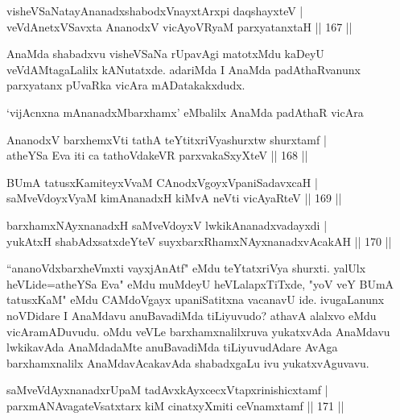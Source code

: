 \begin{shl}
visheVSaNatayA\s \s nanadxshabodxV\s nayxtArxpi daqshayxteV |\\
veVdAnetxVSavxta AnanodxV vicAyoVR\s yaM parxyatanxtaH \hfill || 167 ||
\end{shl}

\begin{artha}
AnaMda shabadxvu visheVSaNa rUpavAgi matotxMdu kaDeyU veVdAMtagaLalilx kANutatxde. adariMda I AnaMda padAthaRvanunx parxyatanx pUvaRka vicAra mADatakakxdudx.
\end{artha}
\centerline{`vijAcnxna mAnanadxMbarxhamx' eMbalilx AnaMda padAthaR vicAra}

\begin{shl}
AnanodxV barxhemxVti tathA teYtitxriVyashurxtw shurxtamf |\\
atheYSa Eva iti ca tathoVdakeVR parxvakaSxyXteV \hfill || 168 ||
\end{shl}

\begin{shl}
BUmA tatusxKamiteyxVvaM CAnodxVgoyxVpaniSadavxcaH |\\
saMveVdoyxV\s yaM kimAnanadxH kiMvA neVti vicAyaRteV \hfill || 169 ||
\end{shl}

\begin{shl}
barxhamxNAyxnanadxH saMveVdoyxV lwkikAnanadxvadayxdi |\\
yukAtxH shabAdxsatxdeYteV suyxbarxRhamxNAyxnanadxvAcakAH \hfill || 170 ||
\end{shl}

\begin{artha}
``ananoVdxbarxheVmxti vayxjAnAtf" eMdu teYtatxriVya shurxti. yalUlx heVLide=atheYSa Eva" eMdu muMdeyU heVLalapxTiTxde, "yoV veY BUmA tatusxKaM" eMdu CAMdoVgayx upaniSatitxna vacanavU ide. ivugaLanunx noVDidare I AnaMdavu anuBavadiMda tiLiyuvudo? athavA alalxvo eMdu vicAramADuvudu. oMdu veVLe barxhamxnalilxruva yukatxvAda AnaMdavu lwkikavAda AnaMdadaMte anuBavadiMda tiLiyuvudAdare AvAga barxhamxnalilx AnaMdavAcakavAda shabadxgaLu ivu yukatxvAguvavu.
\end{artha}


\begin{shl}
saMveVdAyxnanadxrUpaM tadAvxkAyxcecxVtapxrinishicxtamf |\\
parxmANAvagateVsatxtarx kiM cinatxyXmiti ceVnamxtamf \hfill || 171 ||
\end{shl}

